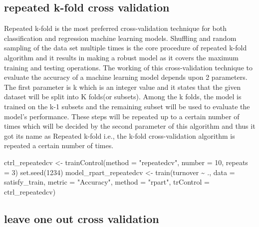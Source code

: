 \documentclass[
]{book}
\newenvironment{Shaded}{\begin{snugshade}}{\end{snugshade}}
\newcommand{\AttributeTok}[1]{\textcolor[rgb]{0.77,0.63,0.00}{#1}}
\newcommand{\DecValTok}[1]{\textcolor[rgb]{0.00,0.00,0.81}{#1}}
\newcommand{\FunctionTok}[1]{\textcolor[rgb]{0.00,0.00,0.00}{#1}}
\newcommand{\NormalTok}[1]{#1}
\newcommand{\OtherTok}[1]{\textcolor[rgb]{0.56,0.35,0.01}{#1}}
\newcommand{\SpecialCharTok}[1]{\textcolor[rgb]{0.00,0.00,0.00}{#1}}
\newcommand{\StringTok}[1]{\textcolor[rgb]{0.31,0.60,0.02}{#1}}
\begin{document}
\hypertarget{repeated-k-fold-cross-validation-1}{%
\subsection{repeated k-fold cross validation}\label{repeated-k-fold-cross-validation-1}}

Repeated k-fold is the most preferred cross-validation technique for both classification and regression machine learning models. Shuffling and random sampling of the data set multiple times is the core procedure of repeated k-fold algorithm and it results in making a robust model as it covers the maximum training and testing operations. The working of this cross-validation technique to evaluate the accuracy of a machine learning model depends upon 2 parameters. The first parameter is k which is an integer value and it states that the given dataset will be split into K folds(or subsets). Among the k folds, the model is trained on the k-1 subsets and the remaining subset will be used to evaluate the model's performance. These steps will be repeated up to a certain number of times which will be decided by the second parameter of this algorithm and thus it got its name as Repeated k-fold i.e., the k-fold cross-validation algorithm is repeated a certain number of times.

\begin{Shaded}
\begin{Highlighting}[]
\NormalTok{ctrl\_repeatedcv }\OtherTok{\textless{}{-}} \FunctionTok{trainControl}\NormalTok{(}\AttributeTok{method =} \StringTok{"repeatedcv"}\NormalTok{, }
                                \AttributeTok{number =} \DecValTok{10}\NormalTok{, }\AttributeTok{repeats =} \DecValTok{3}\NormalTok{)}
\FunctionTok{set.seed}\NormalTok{(}\DecValTok{1234}\NormalTok{)}
\NormalTok{model\_rpart\_repeatedcv }\OtherTok{\textless{}{-}} \FunctionTok{train}\NormalTok{(turnover }\SpecialCharTok{\textasciitilde{}}\NormalTok{ .,}
                        \AttributeTok{data =}\NormalTok{ satisfy\_train,}
                        \AttributeTok{metric =} \StringTok{"Accuracy"}\NormalTok{,}
                        \AttributeTok{method =} \StringTok{"rpart"}\NormalTok{,}
                        \AttributeTok{trControl =}\NormalTok{ ctrl\_repeatedcv)}
\end{Highlighting}
\end{Shaded}

\hypertarget{leave-one-out-cross-validation-1}{%
\subsection{leave one out cross validation}\label{leave-one-out-cross-validation-1}}
\end{document}
